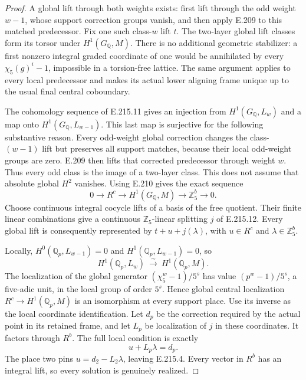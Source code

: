 \begin{proof}
A global lift through both weights exists: first lift through the odd
weight $w-1$, whose support correction groups vanish, and then apply
E.209 to this matched predecessor. Fix one such class-$w$ lift $t$.
The two-layer global lift classes form its torsor under $H^1(G_{\mathbb Q},M)$.
There is no additional geometric stabilizer: a first nonzero integral
graded coordinate of one would be annihilated by every
$\chi_5(g)^i-1$, impossible in a torsion-free lattice. The same argument
applies to every local predecessor and makes its actual lower aligning
frame unique up to the usual final central coboundary.

The cohomology sequence of E.215.11 gives an injection from
$H^1(G_{\mathbb Q},L_w)$ and a map onto
$H^1(G_{\mathbb Q},L_{w-1})$. This last map is surjective for the
following substantive reason. Every odd-weight global correction changes
the class-$(w-1)$ lift but preserves all support matches, because their
local odd-weight groups are zero. E.209 then lifts that corrected
predecessor through weight $w$. Thus every odd class is the image of a
two-layer class. This does not assume that absolute global $H^2$ vanishes.
Using E.210 gives the exact sequence
\[
 0\longrightarrow R^c\longrightarrow H^1(G_{\mathbb Q},M)
 \longrightarrow\mathbb Z_5^b\longrightarrow0.
 \tag{E.215.12}
\]
Choose continuous integral cocycle lifts of a basis of the free quotient.
Their finite linear combinations give a continuous $\mathbb Z_5$-linear
splitting $j$ of E.215.12. Every global lift is consequently represented
by $t+u+j(\lambda)$, with $u\in R^c$ and $\lambda\in\mathbb Z_5^b$.

Locally, $H^0(\mathbb Q_p,L_{w-1})=0$ and
$H^1(\mathbb Q_p,L_{w-1})=0$, so
\[
 H^1(\mathbb Q_p,L_w)\ \xrightarrow{\ \sim\ }\ H^1(\mathbb Q_p,M).
 \tag{E.215.13}
\]
The localization of the global generator
$(\chi_5^w-1)/5^s$ has value $(p^w-1)/5^s$, a five-adic unit,
in the local group of order $5^s$. Hence global central localization
$R^c\to H^1(\mathbb Q_p,M)$ is an isomorphism at every support place.
Use its inverse as the local coordinate identification. Let $d_p$ be
the correction required by the actual point in its retained frame, and
let $L_p$ be localization of $j$ in these coordinates. It factors through
$R^b$. The full local condition is exactly
\[
                       u+L_p\lambda=d_p.
 \tag{E.215.14}
\]
The place two pins $u=d_2-L_2\lambda$, leaving E.215.4. Every vector
in $R^b$ has an integral lift, so every solution is genuinely realized.


\end{proof}

